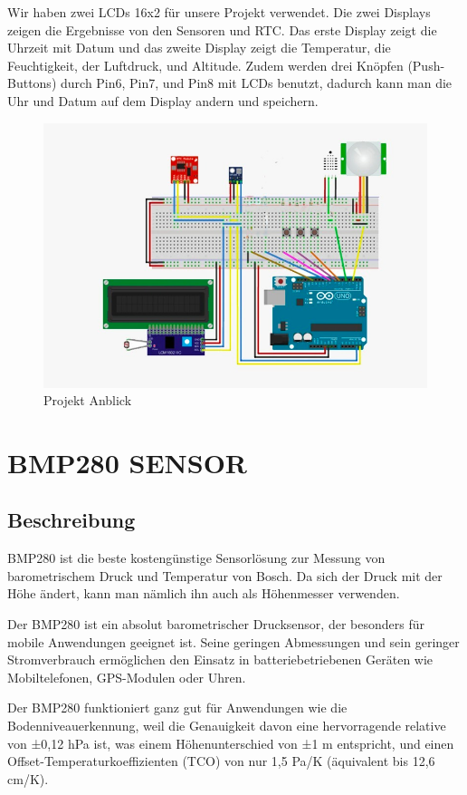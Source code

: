 \documentclass[conference]{IEEEtran}
\begin{document}
Wir haben zwei LCDs 16x2 für unsere Projekt verwendet. Die zwei Displays zeigen die Ergebnisse von den Sensoren und RTC.  Das erste Display zeigt die Uhrzeit mit Datum und das zweite Display zeigt die Temperatur, die Feuchtigkeit, der Luftdruck, und Altitude. 
Zudem werden drei Knöpfen (Push-Buttons) durch Pin6, Pin7, und Pin8 mit LCDs benutzt, dadurch kann man die Uhr und Datum auf dem Display andern und speichern.  
\begin{figure}
	\centering
	\includegraphics[width=1\linewidth]{fig37}
	\caption{Projekt Anblick}
	\label{fig:fig37}
\end{figure}

\section{BMP280 SENSOR}
\subsection{Beschreibung}
BMP280 ist die beste kostengünstige Sensorlösung zur Messung von barometrischem Druck und Temperatur von Bosch. Da sich der Druck mit der Höhe ändert, kann man nämlich ihn auch als Höhenmesser verwenden. 

Der BMP280 ist ein absolut barometrischer Drucksensor, der besonders für mobile Anwendungen geeignet ist. Seine geringen Abmessungen und sein geringer Stromverbrauch ermöglichen den Einsatz in batteriebetriebenen Geräten wie Mobiltelefonen, GPS-Modulen oder Uhren.

Der BMP280 funktioniert ganz gut für Anwendungen wie die Bodenniveauerkennung, weil die Genauigkeit davon eine hervorragende relative von ±0,12 hPa ist, was einem Höhenunterschied von ±1 m entspricht, und einen Offset-Temperaturkoeffizienten (TCO) von nur 1,5 Pa/K (äquivalent bis 12,6 cm/K).
\end{document}
